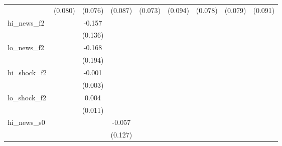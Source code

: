 {\begin{tabular}{l*{8}{c}}
            &     (0.080)         &     (0.076)         &     (0.087)         &     (0.073)         &     (0.094)         &     (0.078)         &     (0.079)         &     (0.091)         \\
\addlinespace
hi\_news\_f2  &                     &      -0.157         &                     &                     &                     &                     &                     &                     \\
            &                     &     (0.136)         &                     &                     &                     &                     &                     &                     \\
\addlinespace
lo\_news\_f2  &                     &      -0.168         &                     &                     &                     &                     &                     &                     \\
            &                     &     (0.194)         &                     &                     &                     &                     &                     &                     \\
\addlinespace
hi\_shock\_f2 &                     &      -0.001         &                     &                     &                     &                     &                     &                     \\
            &                     &     (0.003)         &                     &                     &                     &                     &                     &                     \\
\addlinespace
lo\_shock\_f2 &                     &       0.004         &                     &                     &                     &                     &                     &                     \\
            &                     &     (0.011)         &                     &                     &                     &                     &                     &                     \\
\addlinespace
hi\_news\_s0  &                     &                     &      -0.057         &                     &                     &                     &                     &                     \\
            &                     &                     &     (0.127)         &                     &                     &                     &                     &                     \\

\end{tabular}}
